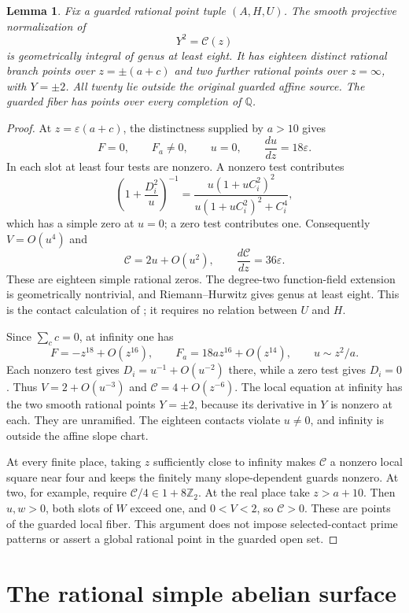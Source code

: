 \documentclass[11pt,a4paper]{article}
\newtheorem{lemma}[theorem]{Lemma}
\newcommand{\Q}{\mathbb Q}\newcommand{\Z}{\mathbb Z}
\begin{document}
\begin{lemma}\label{lem:fiber}
Fix a guarded rational point tuple $(A,H,U)$. The smooth projective
normalization of
\[
                         Y^2=\mathcal C(z)
\]
is geometrically integral of genus at least eight. It has eighteen
distinct rational branch points over $z=\pm(a+c)$ and two further
rational points over $z=\infty$, with $Y=\pm2$.
All twenty lie outside the original guarded affine source.
The guarded fiber has points over every completion of $\Q$.
\end{lemma}
\begin{proof}
At $z=\varepsilon(a+c)$, the distinctness supplied by $a>10$ gives
\[
 F=0,\qquad F_a\ne0,\qquad u=0,\qquad
                         \frac{du}{dz}=18\varepsilon.
\]
In each slot at least four tests are nonzero. A nonzero test contributes
\[
 \left(1+\frac{D_i^2}{u}\right)^{-1}
 =\frac{u(1+uC_i^2)^2}{u(1+uC_i^2)^2+C_i^4},
\]
which has a simple zero at $u=0$; a zero test contributes one.
Consequently $V=O(u^4)$ and
\[
             \mathcal C=2u+O(u^2),\qquad
             \frac{d\mathcal C}{dz}=36\varepsilon.
\]
These are eighteen simple rational zeros. The degree-two
function-field extension is geometrically nontrivial, and
Riemann--Hurwitz gives genus at least eight. This is the contact
calculation of \cite{Genus}; it requires no relation between $U$ and $H$.

Since $\sum_c c=0$, at infinity one has
\[
 F=-z^{18}+O(z^{16}),\qquad
 F_a=18az^{16}+O(z^{14}),\qquad u\sim z^2/a.
\]
Each nonzero test gives $D_i=u^{-1}+O(u^{-2})$ there, while a zero
test gives $D_i=0$. Thus $V=2+O(u^{-3})$ and
$\mathcal C=4+O(z^{-6})$. The local equation at infinity has
the two smooth rational points $Y=\pm2$, because its derivative in
$Y$ is nonzero at each. They are unramified. The eighteen contacts
violate $u\ne0$, and infinity is outside the affine slope chart.

At every finite place, taking $z$ sufficiently close to infinity makes
$\mathcal C$ a nonzero local square near four and keeps the finitely
many slope-dependent guards nonzero. At two, for example, require
$\mathcal C/4\in1+8\Z_2$. At the real place take $z>a+10$.
Then $u,w>0$, both slots of $W$ exceed one, and
$0<V<2$, so $\mathcal C>0$. These are points of the guarded
local fiber. This argument does not impose selected-contact prime
patterns or assert a global rational point in the guarded open set.
\end{proof}

\section{The rational simple abelian surface}
\end{document}
